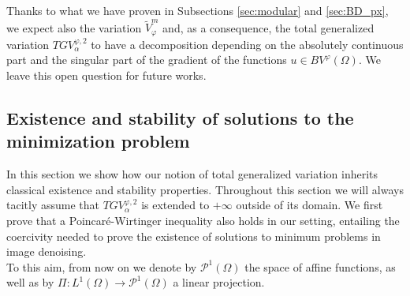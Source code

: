 \documentclass[a4paper,11pt,oneside,notitlepage]{article}
\numberwithin{equation}{section}
\newcommand{\vphi}{\varphi}
\begin{document}
Thanks to what we have proven in Subsections \ref{sec:modular} and \ref{sec:BD_px}, we expect also the variation $\widetilde{V}^m_\vphi$ and, as a consequence, the total generalized variation $TGV^{\vphi,2}_\alpha$ to have a decomposition depending on the absolutely continuous part and the singular part of the gradient of the functions $u \in BV^\vphi(\Omega)$. We leave this open question for future works.

\color{black}

\subsection{Existence and stability of solutions to the minimization problem}
\label{sec:ex_stab}

In this section we show how our notion of total generalized variation inherits classical existence and stability properties. Throughout this section we will always tacitly assume that $TGV^{\vphi,2}_\alpha$ is extended to $+\infty$ outside of its domain. We first prove that a Poincaré-Wirtinger inequality also holds in our setting, entailing the coercivity needed to prove the existence of solutions to minimum problems in image denoising.
\\
To this aim, from now on we denote by $\mathcal{P}^1(\Omega)$ the space of affine functions, as well as by $\Pi:L^1(\Omega)\to \mathcal{P}^1(\Omega)$ a linear projection.
\end{document}
